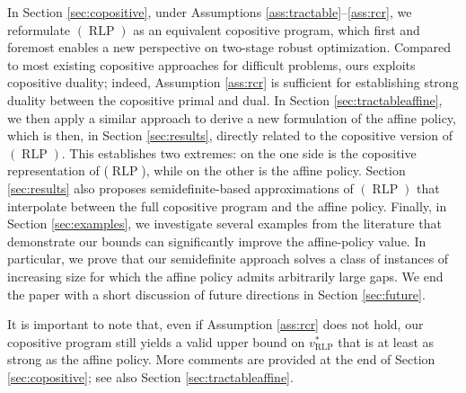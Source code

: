 \documentclass[12pt]{article}
\DeclareMathOperator{\AR}{RLP}
\begin{document}
\begin{onehalfspace}
In Section \ref{sec:copositive}, under Assumptions
\ref{ass:tractable}--\ref{ass:rcr}, we reformulate $(\AR)$ as an
equivalent copositive program, which first and foremost enables a
new perspective on two-stage robust optimization. Compared to most
existing copositive approaches for difficult problems, ours exploits
copositive duality; indeed, Assumption \ref{ass:rcr} is sufficient for
establishing strong duality between the copositive primal and dual. In
Section \ref{sec:tractableaffine}, we then apply a similar approach
to derive a new formulation of the affine policy, which is then, in
Section \ref{sec:results}, directly related to the copositive version
of $(\AR)$. This establishes two extremes: on the one side is the
copositive representation of ($\AR$), while on the other is the affine
policy. Section \ref{sec:results} also proposes semidefinite-based
approximations of $(\AR)$ that interpolate between the full copositive
program and the affine policy. Finally, in Section \ref{sec:examples},
we investigate several examples from the literature that demonstrate our
bounds can significantly improve the affine-policy value. In particular,
we prove that our semidefinite approach solves a class of instances of
increasing size for which the affine policy admits arbitrarily large
gaps. We end the paper with a short discussion of future directions in
Section \ref{sec:future}.

It is important to note that, even if Assumption \ref{ass:rcr} does
not hold, our copositive program still yields a valid upper bound on
$v^*_{\AR}$ that is at least as strong as the affine policy. More
comments are provided at the end of Section \ref{sec:copositive}; see
also Section \ref{sec:tractableaffine}.


\end{onehalfspace}
\end{document}
